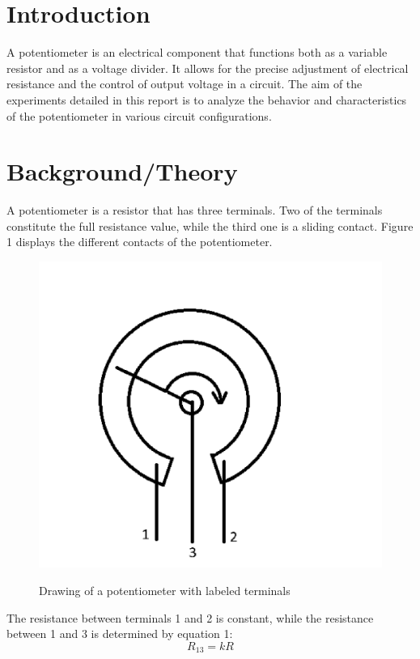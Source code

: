 \documentclass[a4paper]{article}
\begin{document}
\section{Introduction}
A potentiometer is an electrical component that functions both as a variable resistor and as a voltage divider.
It allows for the precise adjustment of electrical resistance and the control of output voltage in a circuit. 
The aim of the experiments detailed in this report is to analyze the behavior and characteristics of the potentiometer
in various circuit configurations.
\section{Background/Theory}
A potentiometer is a resistor that has three terminals. Two of the terminals
constitute the full resistance value, while the third one is a sliding contact.
Figure 1 displays the different contacts of the potentiometer.
\begin{figure}[!ht]
    \centering
    \begin{minipage}{0.4\textwidth}
        \includegraphics[width = \textwidth]{potterminals.png}
       \label{fig:1}
        \caption{\centering Drawing of a potentiometer with labeled terminals}    
    \end{minipage}
\end{figure}

The resistance between terminals 1 and 2 is constant, while the resistance
between 1 and 3 is determined by equation 1:
\begin{equation}
    R_{13} = kR
\end{equation}
\end{document}
